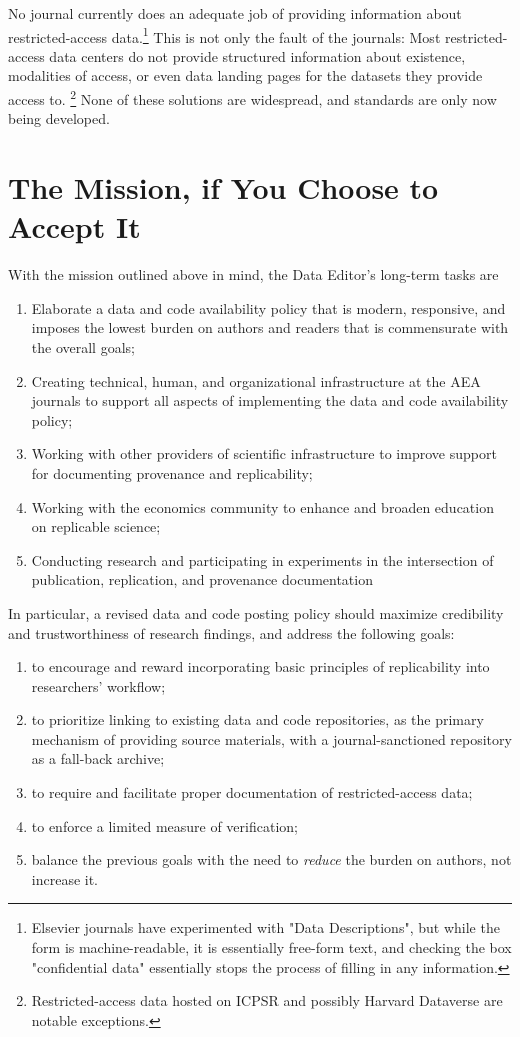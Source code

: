 \documentclass[AEJ]{AEA}
\begin{document}
No journal currently does an adequate job of providing information about restricted-access data.\footnote{Elsevier journals have experimented with "Data Descriptions", but while the form is machine-readable, it is essentially free-form text, and checking the box "confidential data" essentially stops the process of filling in any information.} This is not only the fault of the journals: Most restricted-access data centers do not provide structured information about existence, modalities of access, or even data landing pages for the datasets they provide access to.%
\footnote{Restricted-access data hosted on ICPSR and possibly Harvard Dataverse are notable exceptions.} 
None of these solutions are widespread, and standards are only now being developed.


%
\section{The Mission, if You Choose to Accept It}
With the mission outlined above in mind, the Data Editor's long-term tasks are
\begin{enumerate}
	\item Elaborate a data and code availability policy that is modern, responsive, and imposes the lowest burden on authors and readers that is commensurate with the overall goals;
	\item Creating technical, human, and organizational infrastructure at the AEA journals to support all aspects of implementing the data and code availability policy;
	\item Working with other providers of scientific infrastructure to improve support for documenting provenance and replicability;
	\item Working with the economics community to enhance and broaden education on replicable science;
	\item Conducting research and participating in experiments in the intersection of publication, replication, and provenance documentation
\end{enumerate}
In particular, a revised data and code posting policy should maximize credibility and trustworthiness of research findings, and address the following goals: 
\begin{enumerate}
	\item to encourage and reward incorporating basic principles of replicability into researchers' workflow;
	\item to prioritize linking to existing data and code repositories, as the primary mechanism of providing source materials, with a journal-sanctioned repository as a fall-back archive;
	\item to require and facilitate proper documentation of  restricted-access data;
	\item to enforce a limited measure of verification;
	\item balance the previous goals with the need to \textit{reduce} the burden on authors, not increase it. 
\end{enumerate}
\end{document}
